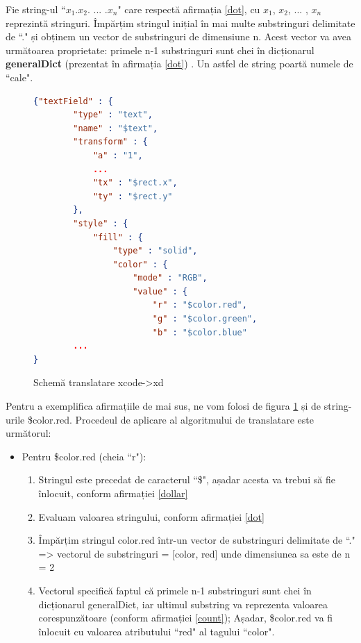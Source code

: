 \begin{mydef}\label{count}
Fie string-ul ``$x_1$.$x_2$. ... .$x_n$" care respectă afirmația \ref{dot}, cu $x_1$, $x_2$, ... , $x_n$ reprezintă stringuri. Împărțim stringul inițial în mai multe substringuri delimitate de ``." și obținem un vector de substringuri de dimensiune n. Acest vector va avea următoarea proprietate: primele n-1 substringuri sunt chei în dicționarul \textbf{generalDict} (prezentat în afirmația \ref{dot}) . Un astfel de string poartă numele de ``cale". \\
\end{mydef}


\begin{figure}[!htbp]
\begin{lstlisting}[language=json,firstnumber=1]
{"textField" : {
        "type" : "text",
        "name" : "$text",
        "transform" : {
            "a" : "1",
            ...
            "tx" : "$rect.x",
            "ty" : "$rect.y"
        },
        "style" : {
            "fill" : {
                "type" : "solid",
                "color" : {
                    "mode" : "RGB",
                    "value" : {
                        "r" : "$color.red",
                        "g" : "$color.green",
                        "b" : "$color.blue"
        ...
}

\end{lstlisting}
\caption{Schemă translatare xcode->xd} \label{fig:XCode2XD Schema}
\end{figure}

Pentru a exemplifica afirmațiile de mai sus, ne vom folosi de figura \ref{fig:XCode2XD Schema} și de string-urile \$color.red. Procedeul de aplicare al algoritmului de translatare este următorul:

\begin{itemize} \label{modalitate}
\item Pentru \$color.red (cheia ``r"): 
\begin{enumerate}
\item Stringul este precedat de caracterul ``\$", așadar acesta va trebui să fie înlocuit, conform afirmației \ref{dollar}
\item Evaluam valoarea stringului, conform afirmației \ref{dot}
\item Împărțim stringul color.red într-un vector de substringuri delimitate de ``." => vectorul de substringuri = [color, red] unde dimensiunea sa este de n = 2
\item Vectorul specifică faptul că primele n-1 substringuri sunt chei în dicționarul generalDict, iar ultimul substring va reprezenta valoarea corespunzătoare (conform afirmației \ref{count}); Așadar, \$color.red va fi înlocuit cu valoarea atributului ``red" al tagului ``color".
\end{enumerate}
\end{itemize}


